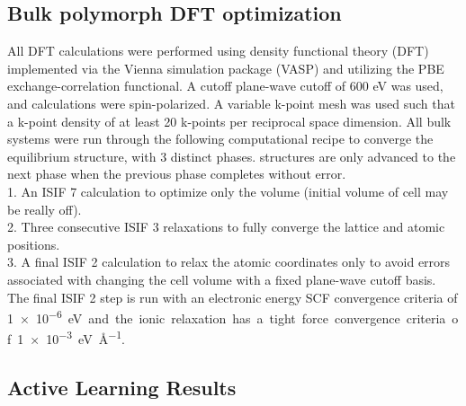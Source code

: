 

\subsection{Bulk polymorph DFT optimization}  %


%
%
All DFT calculations were performed using density functional theory (DFT) implemented via the Vienna  simulation package (VASP) \cite{Kresse1995,Kresse1996_0,Kresse1996_1} and utilizing the PBE exchange-correlation functional\cite{Perdew1996}. A cutoff plane-wave cutoff of 600 eV was used, and calculations were spin-polarized. A variable k-point mesh was used such that a k-point density of at least \num{20} k-points per reciprocal space dimension.
%
All bulk systems were run through the following computational recipe to converge the equilibrium structure, with \num{3} distinct phases. structures are only advanced to the next phase when the previous phase completes without error.
\\
1. An ISIF \num{7} calculation to optimize only the volume (initial volume of cell may be really off).
\\
2. Three consecutive ISIF \num{3} relaxations to fully converge the lattice and atomic positions.
\\
3. A final ISIF \num{2} calculation to relax the atomic coordinates only to avoid errors associated with changing the cell volume with a fixed plane-wave cutoff basis.
\\
The final ISIF \num{2} step is run with an electronic energy SCF convergence criteria of \SI{1e-6} eV and the ionic relaxation has a tight force convergence criteria of \SI{1e-3}{\electronvolt\per\angstrom}.




\subsection{\IrOtwo Active Learning Results} %


